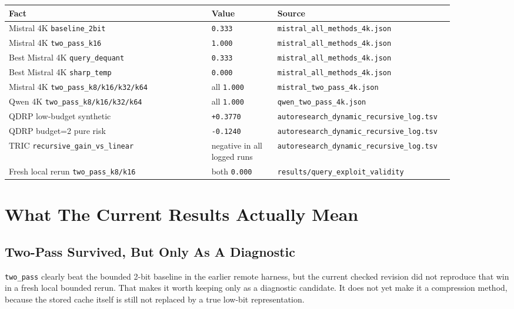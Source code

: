 \documentclass[11pt]{article}
\begin{document}
\begin{table}[H]
\centering
\small
\begin{tabular}{p{0.43\linewidth}p{0.14\linewidth}p{0.31\linewidth}}
\toprule
Fact & Value & Source \\
\midrule
Mistral 4K \texttt{baseline\_2bit} & \texttt{0.333} & \texttt{mistral\_all\_methods\_4k.json} \\
Mistral 4K \texttt{two\_pass\_k16} & \texttt{1.000} & \texttt{mistral\_all\_methods\_4k.json} \\
Best Mistral 4K \texttt{query\_dequant} & \texttt{0.333} & \texttt{mistral\_all\_methods\_4k.json} \\
Best Mistral 4K \texttt{sharp\_temp} & \texttt{0.000} & \texttt{mistral\_all\_methods\_4k.json} \\
Mistral 4K \texttt{two\_pass\_k8/k16/k32/k64} & all \texttt{1.000} & \texttt{mistral\_two\_pass\_4k.json} \\
Qwen 4K \texttt{two\_pass\_k8/k16/k32/k64} & all \texttt{1.000} & \texttt{qwen\_two\_pass\_4k.json} \\
QDRP low-budget synthetic & \texttt{+0.3770} & \texttt{autoresearch\_dynamic\_recursive\_log.tsv} \\
QDRP budget=2 pure risk & \texttt{-0.1240} & \texttt{autoresearch\_dynamic\_recursive\_log.tsv} \\
TRIC \texttt{recursive\_gain\_vs\_linear} & negative in all logged runs & \texttt{autoresearch\_dynamic\_recursive\_log.tsv} \\
Fresh local rerun \texttt{two\_pass\_k8/k16} & both \texttt{0.000} & \texttt{results/query\_exploit\_validity} \\
\bottomrule
\end{tabular}
\end{table}

\section{What The Current Results Actually Mean}

\subsection{Two-Pass Survived, But Only As A Diagnostic}

\texttt{two\_pass} clearly beat the bounded 2-bit baseline in the earlier remote harness,
but the current checked revision did not reproduce that win in a fresh local bounded rerun.
That makes it worth keeping only as a diagnostic candidate. It does not yet make it a
compression method, because the stored cache itself is still not replaced by a true
low-bit representation.
\end{document}
